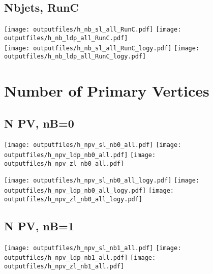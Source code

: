 \documentclass[11pt]{article}
\begin{document}

    \subsection{ Nbjets, RunC}

    \noindent
     \texttt{[image: outputfiles/h\_nb\_sl\_all\_RunC.pdf]}
     \texttt{[image: outputfiles/h\_nb\_ldp\_all\_RunC.pdf]} \\
     \texttt{[image: outputfiles/h\_nb\_sl\_all\_RunC\_logy.pdf]}
     \texttt{[image: outputfiles/h\_nb\_ldp\_all\_RunC\_logy.pdf]}






    \section{Number of Primary Vertices }

    \subsection{ N PV, nB=0 }

    \noindent
     \texttt{[image: outputfiles/h\_npv\_sl\_nb0\_all.pdf]}
     \texttt{[image: outputfiles/h\_npv\_ldp\_nb0\_all.pdf]}
     \texttt{[image: outputfiles/h\_npv\_zl\_nb0\_all.pdf]}

     \texttt{[image: outputfiles/h\_npv\_sl\_nb0\_all\_logy.pdf]}
     \texttt{[image: outputfiles/h\_npv\_ldp\_nb0\_all\_logy.pdf]}
     \texttt{[image: outputfiles/h\_npv\_zl\_nb0\_all\_logy.pdf]}




    \subsection{ N PV, nB=1 }

    \noindent
     \texttt{[image: outputfiles/h\_npv\_sl\_nb1\_all.pdf]}
     \texttt{[image: outputfiles/h\_npv\_ldp\_nb1\_all.pdf]}
     \texttt{[image: outputfiles/h\_npv\_zl\_nb1\_all.pdf]}
\end{document}
